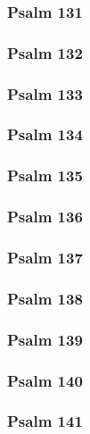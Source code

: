 \documentclass[12pt]{extarticle}
\begin{document}
\begin{multicols}{2}
\subsubsection{Psalm 131}

\newpage

\subsubsection{Psalm 132}

\newpage

\subsubsection{Psalm 133}

\newpage

\subsubsection{Psalm 134}

\newpage

\subsubsection{Psalm 135}

\newpage

\subsubsection{Psalm 136}

\newpage

\subsubsection{Psalm 137}

\newpage

\subsubsection{Psalm 138}

\newpage

\subsubsection{Psalm 139}

\newpage

\subsubsection{Psalm 140}

\newpage

\subsubsection{Psalm 141}

\newpage


\end{multicols}
\end{document}
